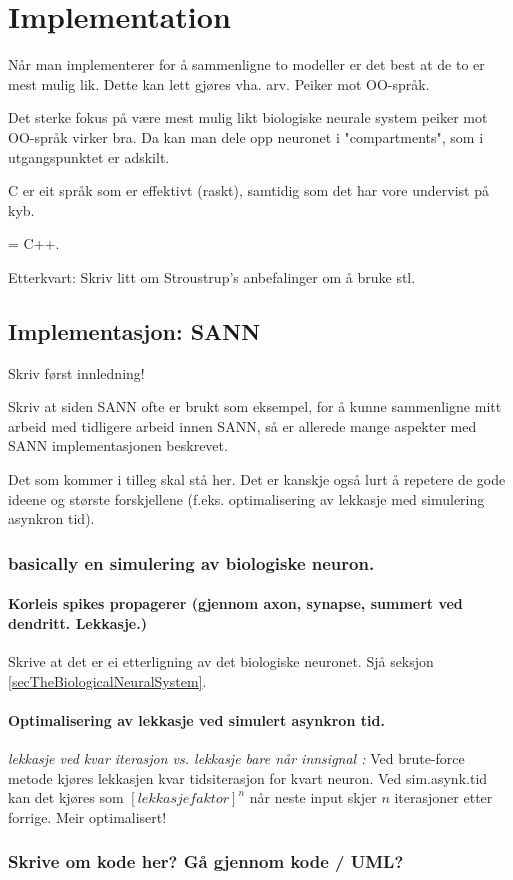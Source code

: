 
\chapter{ Implementation }


	Når man implementerer for å sammenligne to modeller er det best at de to er mest mulig lik. Dette kan lett gjøres vha. arv. Peiker mot OO-språk.
	
	Det sterke fokus på være mest mulig likt biologiske neurale system peiker mot OO-språk virker bra. Da kan man dele opp neuronet i "compartments", som i utgangspunktet er adskilt.

	C er eit språk som er effektivt (raskt), samtidig som det har vore undervist på kyb.

	= C++.

	Etterkvart: Skriv litt om Stroustrup's anbefalinger om å bruke stl.



\section{Implementasjon: SANN}
	Skriv først innledning!

	Skriv at siden SANN ofte er brukt som eksempel, for å kunne sammenligne mitt arbeid med tidligere arbeid innen SANN, så er allerede mange aspekter med SANN implementasjonen beskrevet.

	Det som kommer i tilleg skal stå her.
	Det er kanskje også lurt å repetere de gode ideene og største forskjellene (f.eks. optimalisering av lekkasje med simulering asynkron tid).
	\subsection{basically en simulering av biologiske neuron.}
		\subsubsection{Korleis spikes propagerer (gjennom axon, synapse, summert ved dendritt. Lekkasje.)}
		Skrive at det er ei etterligning av det biologiske neuronet. Sjå seksjon \ref{secTheBiologicalNeuralSystem}.

	\subsubsection{Optimalisering av lekkasje ved simulert asynkron tid.}
		\emph{lekkasje ved kvar iterasjon vs. lekkasje bare når innsignal :}
			Ved brute-force metode kjøres lekkasjen kvar tidsiterasjon for kvart neuron. Ved sim.asynk.tid kan det kjøres som $[lekkasjefaktor]^n$ når neste input skjer $n$ iterasjoner etter forrige. Meir optimalisert!

	\subsection{Skrive om kode her? Gå gjennom kode / UML?}



